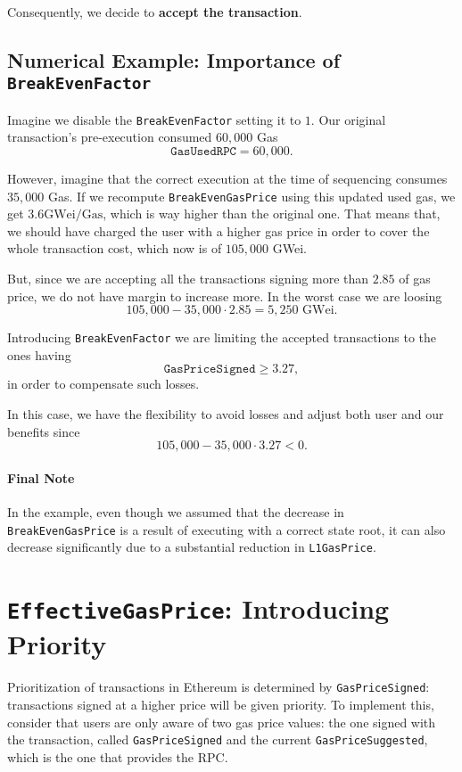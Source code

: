 Consequently, we decide to \textbf{accept the transaction}.


\subsection{Numerical Example: Importance of \texttt{BreakEvenFactor}}

Imagine we disable the \texttt{BreakEvenFactor} setting it to $1$. Our original transaction's pre-execution consumed $60,000$ Gas
\[
\texttt{GasUsedRPC} = 60,000.
\]

However, imagine that the correct execution at the time of sequencing consumes $35,000$ Gas. If we recompute \texttt{BreakEvenGasPrice} using this updated used gas, we get $3.6 \text{GWei/Gas}$, which is way higher than the original one. That means that, we should have charged the user with a higher gas price in order to cover the whole transaction cost, which now is of $105,000$ GWei.

But, since we are accepting all the transactions signing more than $2.85$ of gas price, we do not have margin to increase more. In the worst case we are loosing
\[
105,000 - 35,000 \cdot 2.85 = 5,250 \text{ GWei}.
\]

Introducing \texttt{BreakEvenFactor} we are limiting the accepted transactions to the ones having
\[
\texttt{GasPriceSigned} \geq 3.27,
\]
in order to compensate such losses.

In this case, we have the flexibility to avoid losses and adjust both user and our benefits since
\[
105,000 - 35,000 \cdot 3.27 < 0.
\]

\paragraph*{Final Note}
In the example, even though we assumed that the decrease in \texttt{BreakEvenGasPrice} is a result of executing with a correct state root, it can also decrease significantly due to a substantial reduction in \texttt{L1GasPrice}.





\section{\texttt{EffectiveGasPrice}: Introducing Priority}

Prioritization of transactions in Ethereum is determined by \texttt{GasPriceSigned}: transactions signed at a higher price will be given priority. To implement this, consider that users are only aware of two gas price values: the one signed with the transaction, called \texttt{GasPriceSigned} and the current \texttt{GasPriceSuggested}, which is the one that provides the RPC.

